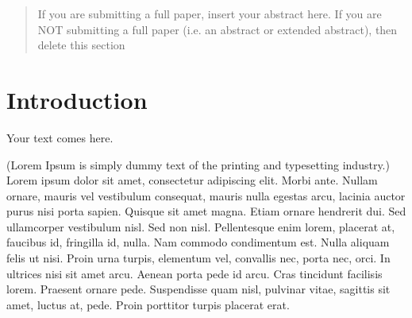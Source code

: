 
\maketitle

\begin{abstract}
If you are submitting a full paper, insert your abstract here.
If you are NOT submitting a full paper (i.e. an abstract or extended abstract), then delete this section
\end{abstract}

\section{Introduction}
\label{intro}
Your text comes here.

(Lorem Ipsum is simply dummy text of the printing and typesetting industry.) Lorem ipsum dolor sit amet, consectetur adipiscing elit. Morbi ante. Nullam ornare, mauris vel vestibulum consequat, mauris nulla egestas arcu, lacinia auctor purus nisi porta sapien. Quisque sit amet magna. Etiam ornare hendrerit dui. Sed ullamcorper vestibulum nisl. Sed non nisl. Pellentesque enim lorem, placerat at, faucibus id, fringilla id, nulla. Nam commodo condimentum est. Nulla aliquam felis ut nisi. Proin urna turpis, elementum vel, convallis nec, porta nec, orci. In ultrices nisi sit amet arcu. Aenean porta pede id arcu. Cras tincidunt facilisis lorem. Praesent ornare pede. Suspendisse quam nisl, pulvinar vitae, sagittis sit amet, luctus at, pede. Proin porttitor turpis placerat erat.

